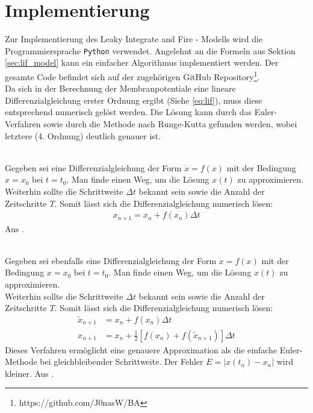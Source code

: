 \section{Implementierung}
\label{sec:lif_imp}
	Zur Implementierung des Leaky Integrate and Fire - Modells wird die Programmiersprache \texttt{Python} verwendet. Angelehnt an die Formeln aus Sektion \ref{sec:lif_model} kann ein einfacher Algorithmus implementiert werden. Der gesamte Code befindet sich auf der zugehörigen GitHub Repository\footnote{https://github.com/J0nasW/BA}.\\
	Da sich in der Berechnung der Membranpotentiale eine lineare Differenzialgleichung erster Ordnung ergibt (Siehe \eqref{eq:lif}), muss diese entsprechend numerisch gelöst werden. Die Lösung kann durch das Euler-Verfahren sowie durch die Methode nach Runge-Kutta gefunden werden, wobei letztere (4. Ordnung) deutlich genauer ist.
	\begin{remark}\\
		Gegeben sei eine Differenzialgleichung der Form $\dot{x} = f(x)$ mit der Bedingung $x = x_0$ bei $t = t_0$. Man finde einen Weg, um die Lösung $x(t)$ zu approximieren.\\
		Weiterhin sollte die Schrittweite $\Delta t$ bekannt sein sowie die Anzahl der Zeitschritte $T$. Somit lässt sich die Differenzialgleichung numerisch lösen:
		\begin{align}
			\label{eq:euler}
			x_{n+1} = x_n + f(x_n) \Delta t
		\end{align}
		Aus \cite{NonlinearDynamics}.
	\end{remark}
	\begin{remark}\\
		Gegeben sei ebenfalls eine Differenzialgleichung der Form $\dot{x} = f(x)$ mit der Bedingung $x = x_0$ bei $t = t_0$. Man finde einen Weg, um die Lösung $x(t)$ zu approximieren.\\
		Weiterhin sollte die Schrittweite $\Delta t$ bekannt sein sowie die Anzahl der Zeitschritte $T$. Somit lässt sich die Differenzialgleichung numerisch lösen:
		\begin{align}
			\label{eq:erw_euler}
			\tilde{x}_{n+1} &= x_n + f(x_n) \Delta t\\
			x_{n+1} &= x_n + \tfrac{1}{2}[f(x_n) + f(\tilde{x}_{n+1})]\Delta t
		\end{align}
		Dieses Verfahren ermöglicht eine genauere Approximation als die einfache Euler-Methode bei gleichbleibender Schrittweite. Der Fehler $E = |x(t_n)-x_n|$ wird kleiner. Aus \cite{NonlinearDynamics}.
	\end{remark}
